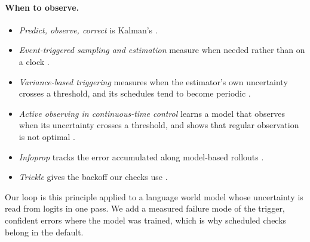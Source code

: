 \documentclass[11pt]{article}
\begin{document}
\paragraph{When to observe.}
\begin{itemize}
  \item \emph{Predict, observe, correct} is Kalman's \cite{kalman1960}.
  \item \emph{Event-triggered sampling and estimation} measure when needed rather than on a clock
  \cite{astrom2002,tabuada2007}.
  \item \emph{Variance-based triggering} measures when the estimator's own uncertainty crosses a threshold, and its
  schedules tend to become periodic \cite{trimpe2014}.
  \item \emph{Active observing in continuous-time control} learns a model that observes when its uncertainty crosses a
  threshold, and shows that regular observation is not optimal \cite{holt2023}.
  \item \emph{Infoprop} tracks the error accumulated along model-based rollouts \cite{infoprop2025}.
  \item \emph{Trickle} gives the backoff our checks use \cite{rfc6206}.
\end{itemize}
Our loop is this principle applied to a language world model whose uncertainty is read from logits in one pass. We add
a measured failure mode of the trigger, confident errors where the model was trained, which is why scheduled checks
belong in the default.
\end{document}
